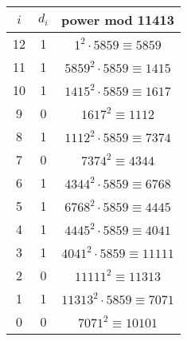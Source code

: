 \begin{center}
\begin{tabular}{c|c|c}
$i$ & $d_i$ & power mod 11413 \\\hline 
12 & 1 & $1^2 \cdot 5859 \equiv 5859$ \\
11 & 1 & $5859^2 \cdot 5859 \equiv 1415$ \\
10 & 1 & $1415^2 \cdot 5859 \equiv 1617$ \\
9 & 0 & $1617^2 \equiv 1112$ \\
8 & 1 & $1112^2 \cdot 5859 \equiv 7374$ \\
7 & 0 & $7374^2 \equiv 4344$ \\
6 & 1 & $4344^2 \cdot 5859 \equiv 6768$ \\
5 & 1 & $6768^2 \cdot 5859 \equiv 4445$ \\
4 & 1 & $4445^2 \cdot 5859 \equiv 4041$ \\
3 & 1 & $4041^2 \cdot 5859 \equiv 11111$ \\
2 & 0 & $11111^2 \equiv 11313$ \\
1 & 1 & $11313^2 \cdot 5859 \equiv 7071$ \\
0 & 0 & $7071^2 \equiv 10101$ \\
\end{tabular}
\end{center}
